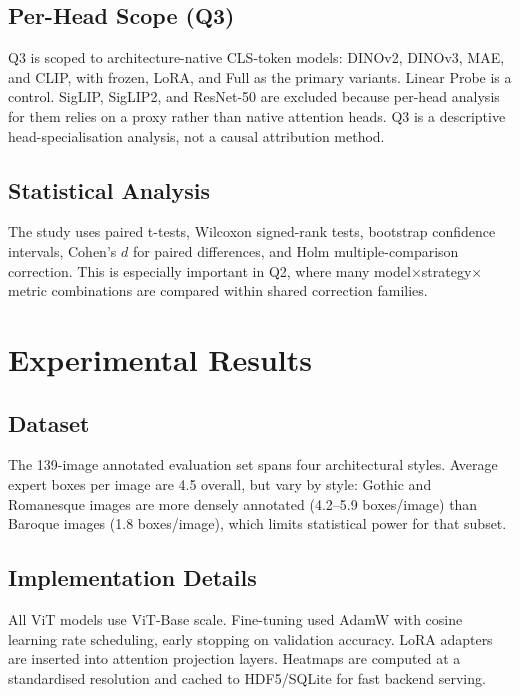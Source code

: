 \documentclass[lineno,pdflatex,sn-mathphys-num]{sn-jnl}%
\theoremstyle{thmstyleone}%
\theoremstyle{thmstyletwo}%
\theoremstyle{thmstylethree}%
\begin{document}
\subsection{Per-Head Scope (Q3)}

Q3 is scoped to architecture-native CLS-token models: DINOv2, DINOv3, MAE,
and CLIP, with frozen, LoRA, and Full as the primary variants. Linear Probe is
a control. SigLIP, SigLIP2, and ResNet-50 are excluded because per-head
analysis for them relies on a proxy rather than native attention heads. Q3 is a
descriptive head-specialisation analysis, not a causal attribution method.

\subsection{Statistical Analysis}

The study uses paired t-tests, Wilcoxon signed-rank tests, bootstrap confidence
intervals, Cohen's $d$ for paired differences, and Holm multiple-comparison
correction. This is especially important in Q2, where many
model$\times$strategy$\times$metric combinations are compared within shared
correction families.

\section{Experimental Results}
\label{sec:results}

\subsection{Dataset}

The 139-image annotated evaluation set spans four architectural styles. Average
expert boxes per image are 4.5 overall, but vary by style: Gothic and
Romanesque images are more densely annotated (4.2--5.9 boxes/image) than
Baroque images (1.8 boxes/image), which limits statistical power for that
subset.

\subsection{Implementation Details}

All ViT models use ViT-Base scale. Fine-tuning used AdamW with cosine learning
rate scheduling, early stopping on validation accuracy. LoRA adapters are
inserted into attention projection layers. Heatmaps are computed at a
standardised resolution and cached to HDF5/SQLite for fast backend serving.
\end{document}
